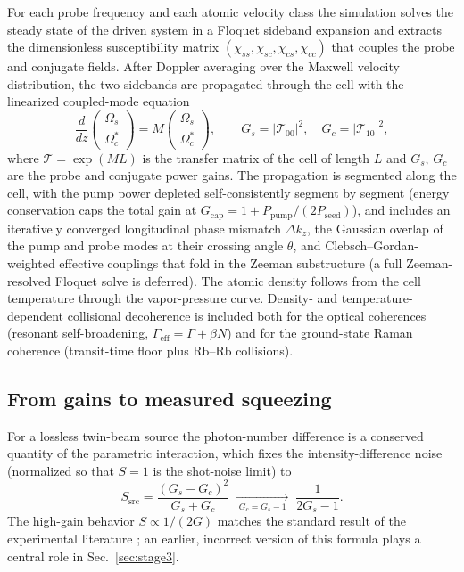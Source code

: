 \documentclass[11pt,a4paper]{article}
\begin{document}
For each probe frequency and each atomic velocity class the simulation
solves the steady state of the driven system in a Floquet sideband expansion
and extracts the dimensionless susceptibility matrix
$(\bar\chi_{ss},\bar\chi_{sc},\bar\chi_{cs},\bar\chi_{cc})$ that couples the
probe and conjugate fields. After Doppler averaging over the Maxwell
velocity distribution, the two sidebands are propagated through the cell
with the linearized coupled-mode equation
\begin{equation}
\frac{d}{dz}\begin{pmatrix}\Omega_s\\ \Omega_c^{*}\end{pmatrix}
= M\begin{pmatrix}\Omega_s\\ \Omega_c^{*}\end{pmatrix},
\qquad
G_s=\bigl|\mathcal{T}_{00}\bigr|^2,\quad G_c=\bigl|\mathcal{T}_{10}\bigr|^2,
\label{eq:prop}
\end{equation}
where $\mathcal{T}=\exp(ML)$ is the transfer matrix of the cell of length
$L$ and $G_s$, $G_c$ are the probe and conjugate power gains. The
propagation is segmented along the cell, with the pump power depleted
self-consistently segment by segment (energy conservation caps the total
gain at $G_{\mathrm{cap}}=1+P_{\mathrm{pump}}/(2P_{\mathrm{seed}})$), and
includes an iteratively converged longitudinal phase mismatch $\Delta k_z$, the
Gaussian overlap of the pump and probe modes at their crossing angle
$\theta$, and Clebsch--Gordan-weighted effective couplings that fold in the
Zeeman substructure (a full Zeeman-resolved Floquet solve is deferred).
The atomic density follows from the cell temperature through the
vapor-pressure curve. Density- and temperature-dependent collisional
decoherence is included both for the optical coherences (resonant
self-broadening, $\Gamma_{\mathrm{eff}}=\Gamma+\beta N$) and for the
ground-state Raman coherence (transit-time floor plus Rb--Rb collisions).

\subsection{From gains to measured squeezing}
\label{sec:noisemodel}
For a lossless twin-beam source the photon-number difference is a conserved
quantity of the parametric interaction, which fixes the intensity-difference
noise (normalized so that $S=1$ is the shot-noise limit) to
\begin{equation}
S_{\mathrm{src}}=\frac{(G_s-G_c)^2}{G_s+G_c}
\;\xrightarrow[\;G_c=G_s-1\;]{}\;\frac{1}{2G_s-1}.
\label{eq:sideal}
\end{equation}
The high-gain behavior $S\propto 1/(2G)$ matches the standard result of the
experimental literature \cite{Sim2025}; an earlier, incorrect version of
this formula plays a central role in Sec.~\ref{sec:stage3}.
\end{document}

